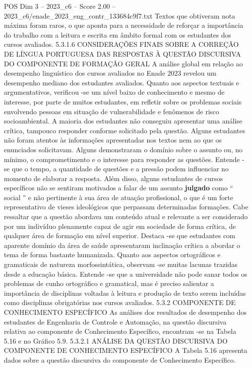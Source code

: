 \begin{textsample}{POS Dim 3 – 2023\_c6 – Score 2.00 – 2023\_c6/enade\_2023\_eng\_contr\_133684c9f7.txt}
Textos que obtiveram nota máxima foram raros, o que aponta para a necessidade de reforçar a importância do trabalho com a leitura e escrita em âmbito formal com os estudantes dos cursos avaliados. 5.3.1.6 CONSIDERAÇÕES FINAIS SOBRE A CORREÇÃO DE LÍNGUA PORTUGUESA DAS RESPOSTAS À QUESTÃO DISCURSIVA DO COMPONENTE DE FORMAÇÃO GERAL A análise global em relação ao desempenho linguístico dos cursos avaliados no Enade 2023 revelou um desempenho mediano dos estudantes avaliados.
Quanto aos aspectos textuais e argumentativos, verificou -se um nível baixo de conhecimento e mesmo de interesse, por parte de muitos estudantes, em refletir sobre os problemas sociais envolvendo pessoas em situação de vulnerabilidade e fenômenos de risco socioambiental.
A maioria dos estudantes não conseguiu apresentar uma análise crítica, tampouco responder conforme solicitado pela questão.
Alguns estudantes não foram atentos às informações apresentadas nos textos nem ao que os enunciados solicitavam.
Alguns demonstraram o domínio sobre o assunto ou, no mínimo, o comprometimento e o interesse para responder as questões.
Entende -se que o tempo, a quantidade de questões e a pressão podem influenciar no momento de elaborar a resposta.
Além disso, alguns estudantes de cursos específicos não se sentiram motivados a falar de um assunto \textbf{julgado} como “ social ” e não pertinente à sua área de atuação profissional, o que é um forte representativo de vieses ideológicos que perpassam determinadas formações.
Cabe ressaltar que a questão abordava um conteúdo atual e relevante a ser considerado por um indivíduo plenamente capaz de agir em sociedade de forma crítica, de qualquer área de formação em nível superior.
Destaca -se que estudantes com aparente domínio da área de saúde apresentaram inclinação crítica a abordar o tema de forma bastante humanizada.
Quanto aos aspectos ortográficos e gramaticais de natureza morfossintática, observam -se muitas lacunas trazidas desde a educação básica.
Entende -se que a universidade não pode sanar todos os problemas de cunho ortográfico e gramatical, mas é preciso salientar a importância de disciplinas voltadas à leitura e produção de texto serem incluídas como disciplinas obrigatórias nos cursos avaliados. 5.3.2 COMPONENTE DE CONHECIMENTO ESPECÍFICO As análises dos resultados de desempenho dos estudantes de Engenharia de Controle e Automação, na questão discursiva relativa ao componente de Conhecimento Específico, encontram -se na Tabela 5.16 e no Gráfico 5.9. 5.3.2.1 ANÁLISE DA QUESTÃO DISCURSIVA DO COMPONENTE DE CONHECIMENTO ESPECÍFICO A Tabela 5.16 apresenta dados sobre a questão discursiva do componente de Conhecimento Específico.

\end{textsample}

